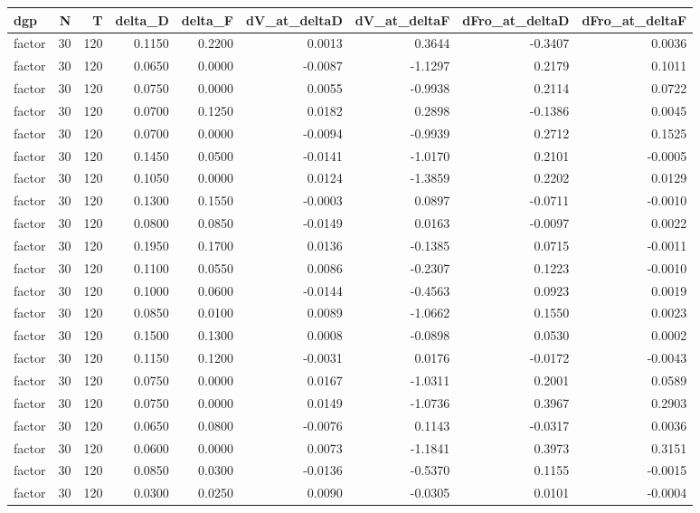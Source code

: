 \begin{tabular}{lrrrrrrrr}
\toprule
dgp & N & T & delta_D & delta_F & dV_at_deltaD & dV_at_deltaF & dFro_at_deltaD & dFro_at_deltaF \\
\midrule
factor & 30 & 120 & 0.1150 & 0.2200 & 0.0013 & 0.3644 & -0.3407 & 0.0036 \\
factor & 30 & 120 & 0.0650 & 0.0000 & -0.0087 & -1.1297 & 0.2179 & 0.1011 \\
factor & 30 & 120 & 0.0750 & 0.0000 & 0.0055 & -0.9938 & 0.2114 & 0.0722 \\
factor & 30 & 120 & 0.0700 & 0.1250 & 0.0182 & 0.2898 & -0.1386 & 0.0045 \\
factor & 30 & 120 & 0.0700 & 0.0000 & -0.0094 & -0.9939 & 0.2712 & 0.1525 \\
factor & 30 & 120 & 0.1450 & 0.0500 & -0.0141 & -1.0170 & 0.2101 & -0.0005 \\
factor & 30 & 120 & 0.1050 & 0.0000 & 0.0124 & -1.3859 & 0.2202 & 0.0129 \\
factor & 30 & 120 & 0.1300 & 0.1550 & -0.0003 & 0.0897 & -0.0711 & -0.0010 \\
factor & 30 & 120 & 0.0800 & 0.0850 & -0.0149 & 0.0163 & -0.0097 & 0.0022 \\
factor & 30 & 120 & 0.1950 & 0.1700 & 0.0136 & -0.1385 & 0.0715 & -0.0011 \\
factor & 30 & 120 & 0.1100 & 0.0550 & 0.0086 & -0.2307 & 0.1223 & -0.0010 \\
factor & 30 & 120 & 0.1000 & 0.0600 & -0.0144 & -0.4563 & 0.0923 & 0.0019 \\
factor & 30 & 120 & 0.0850 & 0.0100 & 0.0089 & -1.0662 & 0.1550 & 0.0023 \\
factor & 30 & 120 & 0.1500 & 0.1300 & 0.0008 & -0.0898 & 0.0530 & 0.0002 \\
factor & 30 & 120 & 0.1150 & 0.1200 & -0.0031 & 0.0176 & -0.0172 & -0.0043 \\
factor & 30 & 120 & 0.0750 & 0.0000 & 0.0167 & -1.0311 & 0.2001 & 0.0589 \\
factor & 30 & 120 & 0.0750 & 0.0000 & 0.0149 & -1.0736 & 0.3967 & 0.2903 \\
factor & 30 & 120 & 0.0650 & 0.0800 & -0.0076 & 0.1143 & -0.0317 & 0.0036 \\
factor & 30 & 120 & 0.0600 & 0.0000 & 0.0073 & -1.1841 & 0.3973 & 0.3151 \\
factor & 30 & 120 & 0.0850 & 0.0300 & -0.0136 & -0.5370 & 0.1155 & -0.0015 \\
factor & 30 & 120 & 0.0300 & 0.0250 & 0.0090 & -0.0305 & 0.0101 & -0.0004 \\

\end{tabular}
